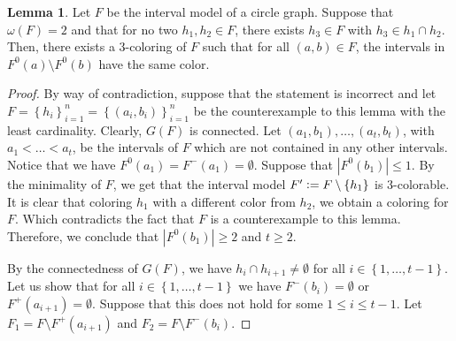 \documentclass[12pt]{article}
\theoremstyle{definition}
\newtheorem{lemma}[thm]{Lemma}
\newcommand{\defeq}{\vcentcolon=}
\begin{document}
    \begin{lemma} \label{lemma:4.4}
        Let $F$ be the interval
        model of a circle graph.
        Suppose that $\omega\left(F\right) = 2$ 
        and that for no two
        $h_1, h_2 \in F$,
        there exists $h_3 \in F$ 
        with $h_3 \in h_1 \cap h_2$.
        Then, there exists a 3-coloring
        of $F$ such that for all
        $\left(a, b\right) \in F$, 
        the intervals in $F^{0}\left(a\right) 
        \setminus F^{0}\left(b\right)$
        have the same color. 
    \end{lemma}
    \begin{proof}
        By way of contradiction,
        suppose that the statement is incorrect
        and let $F = \left\{h_{i}\right\}_{i = 1}^{n} =
        \left\{\left(a_{i}, b_{i}\right)\right\}_{i = 1}^{n}$
        be the counterexample
        to this lemma with the
        least cardinality.
        Clearly, $G\left(F\right)$ is 
        connected. 
        Let $\left(a_1, b_1\right),
        \ldots, \left(a_{t}, b_{t}\right)$,
        with $a_1 < \ldots < a_{t}$,
        be the intervals of $F$ which
        are not contained in any other 
        intervals. Notice that we have
        $F^{0}\left(a_{1}\right) = 
        F^{-}\left(a_1\right) = \emptyset$.
        Suppose that $\left|F^{0}\left(b_1\right)\right| \leq 1$.
        By the minimality of $F$,
        we get that the interval
        model $F' \defeq F \setminus \left\{h_{1}\right\}$ 
        is 3-colorable. It is clear
        that coloring $h_1$ with a different
        color from $h_2$, we obtain a coloring
        for $F$. Which contradicts the fact
        that $F$ is a counterexample to this lemma.
        Therefore, we conclude that $\left|F^{0}\left(b_1\right)\right| \geq 2$ 
        and $t \geq 2$.

        By the connectedness of $G\left(F\right)$,
        we have $h_{i} \cap h_{i+1} \neq \emptyset$ 
        for all $i \in \left\{1, \ldots, t -1\right\}$.
        Let us show that for all
        $i \in \left\{1, \ldots, t - 1\right\}$
        we have
        $F^{-}\left(b_{i}\right) = \emptyset$ 
        or $F^{+}\left(a_{i+1}\right) = \emptyset$.
        Suppose that this does not
        hold for some $1 \leq i \leq t - 1$.
        Let $F_1 = F \setminus F^{+}\left(a_{i+1}\right)$
        and $F_2 = F \setminus F^{-}\left(b_{i}\right)$.
        

\end{proof}
\end{document}
